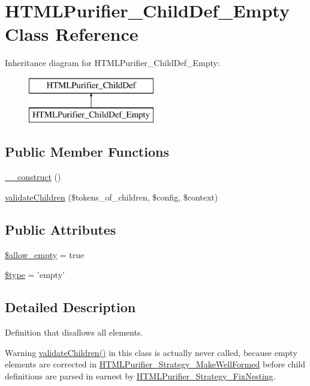 \hypertarget{classHTMLPurifier__ChildDef__Empty}{\section{H\+T\+M\+L\+Purifier\+\_\+\+Child\+Def\+\_\+\+Empty Class Reference}
\label{classHTMLPurifier__ChildDef__Empty}
}
Inheritance diagram for H\+T\+M\+L\+Purifier\+\_\+\+Child\+Def\+\_\+\+Empty\+:\begin{figure}[H]
\begin{center}
\leavevmode
\includegraphics[height=2.000000cm]{classHTMLPurifier__ChildDef__Empty}
\end{center}
\end{figure}
\subsection*{Public Member Functions}
\begin{DoxyCompactItemize}
\item 
\hyperlink{classHTMLPurifier__ChildDef__Empty_a95be4523755714aac051b117f2be88a8}{\+\_\+\+\_\+construct} ()
\item 
\hyperlink{classHTMLPurifier__ChildDef__Empty_a3cad5998eeba56ee5ef1702d77ba35d1}{validate\+Children} (\$tokens\+\_\+of\+\_\+children, \$config, \$context)
\end{DoxyCompactItemize}
\subsection*{Public Attributes}
\begin{DoxyCompactItemize}
\item 
\hyperlink{classHTMLPurifier__ChildDef__Empty_aac95e7cc2a385915d0db8fc88954e252}{\$allow\+\_\+empty} = true
\item 
\hyperlink{classHTMLPurifier__ChildDef__Empty_ac69b98705c247629be35b69cd9e98dff}{\$type} = 'empty'
\end{DoxyCompactItemize}


\subsection{Detailed Description}
Definition that disallows all elements. \begin{DoxyWarning}{Warning}
\hyperlink{classHTMLPurifier__ChildDef__Empty_a3cad5998eeba56ee5ef1702d77ba35d1}{validate\+Children()} in this class is actually never called, because empty elements are corrected in \hyperlink{classHTMLPurifier__Strategy__MakeWellFormed}{H\+T\+M\+L\+Purifier\+\_\+\+Strategy\+\_\+\+Make\+Well\+Formed} before child definitions are parsed in earnest by \hyperlink{classHTMLPurifier__Strategy__FixNesting}{H\+T\+M\+L\+Purifier\+\_\+\+Strategy\+\_\+\+Fix\+Nesting}. 
\end{DoxyWarning}



